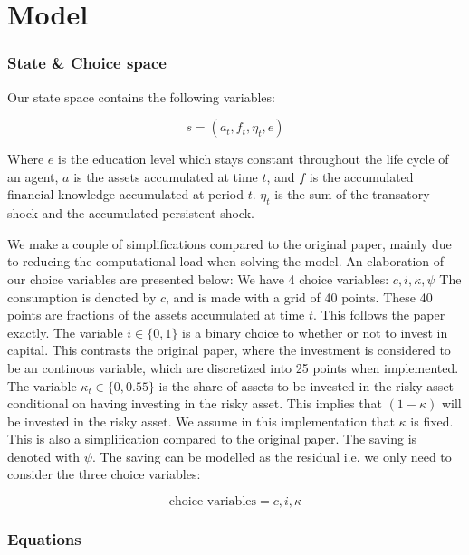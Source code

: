 \section{Model}

\subsubsection{State \& Choice space}\label{sec:stateandchoicespace}
Our state space contains the following variables:

\begin{equation}
    s = (a_t, f_t, \eta_t, e)
\end{equation}

Where $e$ is the education level which stays constant throughout the life cycle of an agent, $a$ is the assets accumulated at time $t$, and $f$ is the accumulated financial knowledge accumulated at period $t$. $\eta_t$ is the sum of the transatory shock and the accumulated persistent shock.

We make a couple of simplifications compared to the original paper, mainly due to reducing the computational load when solving the model. An elaboration of our choice variables are presented below:
We have 4 choice variables: $ c, i, \kappa, \psi$ The consumption is denoted by $c$, and is made with a grid of 40 points. These 40 points are fractions of the assets accumulated at time $t$. This follows the paper exactly. The variable $i \in \{0, 1\}$ is a binary choice to whether or not to invest in capital. This contrasts the original paper, where the investment is considered to be an continous variable, which are discretized into 25 points when implemented. The variable $\kappa_t \in \{0 , 0.55\}$ is the share of assets to be invested in the risky asset conditional on having investing in the risky asset. This implies that $(1 - \kappa)$ will be invested in the risky asset. We assume in this implementation that $\kappa$ is fixed. This is also a simplification compared to the original paper. The saving is denoted with $\psi$. The saving can be modelled as the residual i.e. we only need to consider the three choice variables:

\begin{equation}
    \text{choice variables} = c, i, \kappa
\end{equation}

\subsubsection{Equations}

